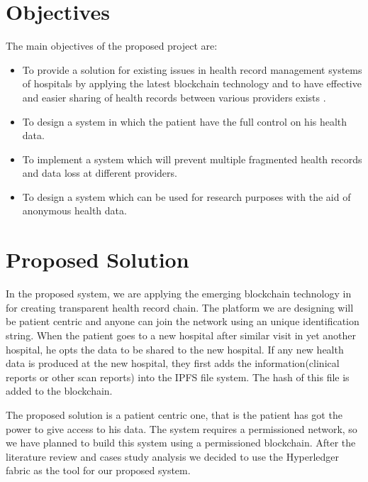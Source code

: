 \documentclass[11pt]{report}
\begin{document}
\section{Objectives}  %

The main objectives of the proposed project are:

\begin{itemize}
        \item To provide a solution for existing issues in health record management systems of hospitals by applying the latest blockchain technology and to have effective and easier sharing of health records between various providers exists .
        \item To design a system in which the patient  have the full control on his health data.
  
        \item To implement a system which will prevent multiple fragmented health records and data loss at different providers.
        \item To design a system which can be used for research purposes with the aid of anonymous health data.
    
    \end{itemize}



\section{Proposed Solution} 

\par In the proposed system, we are applying  the emerging blockchain technology in for creating transparent health record chain. The platform we are designing will be patient centric and anyone can join the network using an unique identification string. When the patient goes to a new hospital after similar visit in yet another hospital, he opts the data to be shared to the new hospital. If any new health data is produced at the new hospital, they first adds the information(clinical reports or other scan reports) into the IPFS file system. The hash of this file is added to the blockchain.
\par 	The proposed solution is a patient centric one, that is the patient has got the power to give access to his data. The system requires a permissioned network, so we have planned to build this system using a permissioned blockchain. After the literature review and cases study analysis we decided to use the Hyperledger fabric as the tool for our proposed system.
\end{document}
